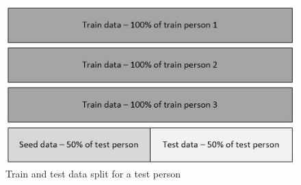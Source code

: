 \documentclass[10pt,twocolumn,letterpaper]{article}
\begin{document}
\begin{figure}[h]
	\begin{center}
		\includegraphics[width=\linewidth]{train_test_dat}
	\end{center}
	\caption{Train and test data split for a test person}
	\label{fig:train_test_dat}
\end{figure}
\end{document}
